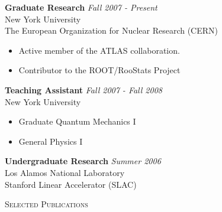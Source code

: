 \documentclass[9pt]{article}
\newenvironment{changemargin}[2]{%
  \begin{list}{}{%
    \setlength{\topsep}{0pt}%
    \setlength{\leftmargin}{#1}%
    \setlength{\rightmargin}{#2}%
    \setlength{\listparindent}{\parindent}%
    \setlength{\itemindent}{\parindent}%
    \setlength{\parsep}{\parskip}%
  }%
  \item[]}{\end{list}
}
\newcommand{\lineover}{
	\begin{changemargin}{-0.05in}{-0.05in}
		\vspace*{-8pt}
		\hrulefill \\
		\vspace*{-2pt}
	\end{changemargin}
}
\newcommand{\header}[1]{
	\begin{changemargin}{-0.5in}{-0.5in}
		\scshape{#1}\\
  	\lineover
	\end{changemargin}
}
\newenvironment{body} {
	\vspace*{-16pt}
	\begin{changemargin}{-0.25in}{-0.5in}
  }	
	{\end{changemargin}
}
\begin{document}
\begin{body}
	\vspace{14pt}
	\textbf{Graduate Research} \hfill \emph{Fall 2007 - Present}\\
	New York University \\
        The European Organization for Nuclear Research (CERN) \\
	\vspace*{-4pt}
	\begin{itemize} \itemsep -0pt  %
		\item Active member of the ATLAS collaboration.
                \item Contributor to the ROOT/RooStats Project
	\end{itemize}

	\textbf {Teaching Assistant} \hfill \emph{Fall 2007 - Fall 2008}\\
        New York University \\
	\vspace*{-4pt}
	\begin{itemize} \itemsep -0pt
		\item Graduate Quantum Mechanics I
                \item General Physics I
	\end{itemize}

	\textbf {Undergraduate Research} \hfill \emph{Summer 2006}\\
        Los Alamos National Laboratory \\
        Stanford Linear Accelerator (SLAC) \\

\end{body}

\smallskip



\header{Selected Publications}
\end{document}

